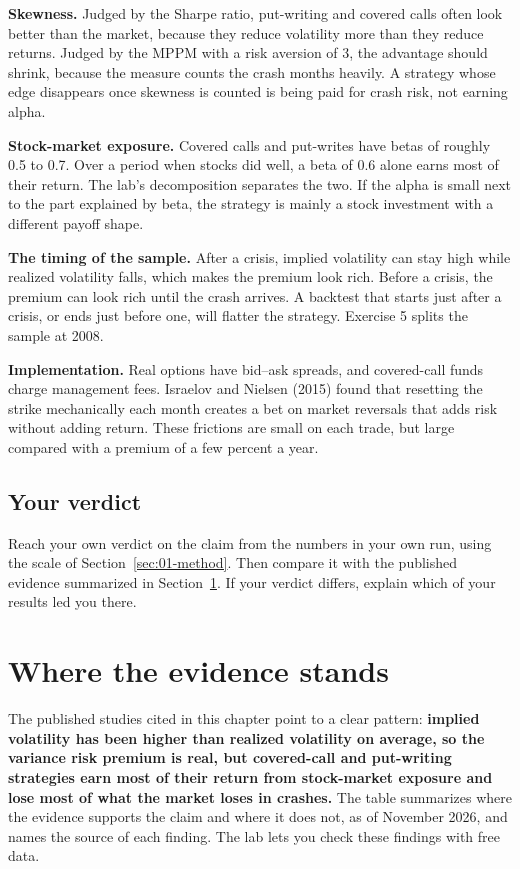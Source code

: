 \textbf{Skewness.} Judged by the Sharpe ratio, put-writing and covered calls often look better than the market, because they reduce volatility more than they reduce returns. Judged by the MPPM with a risk aversion of 3, the advantage should shrink, because the measure counts the crash months heavily. A strategy whose edge disappears once skewness is counted is being paid for crash risk, not earning alpha.

\textbf{Stock-market exposure.} Covered calls and put-writes have betas of roughly 0.5 to 0.7. Over a period when stocks did well, a beta of 0.6 alone earns most of their return. The lab's decomposition separates the two. If the alpha is small next to the part explained by beta, the strategy is mainly a stock investment with a different payoff shape.

\textbf{The timing of the sample.} After a crisis, implied volatility can stay high while realized volatility falls, which makes the premium look rich. Before a crisis, the premium can look rich until the crash arrives. A backtest that starts just after a crisis, or ends just before one, will flatter the strategy. Exercise 5 splits the sample at 2008.

\textbf{Implementation.} Real options have bid--ask spreads, and covered-call funds charge management fees. Israelov and Nielsen (2015) found that resetting the strike mechanically each month creates a bet on market reversals that adds risk without adding return. These frictions are small on each trade, but large compared with a premium of a few percent a year.

\subsection*{Your verdict}

Reach your own verdict on the claim from the numbers in your own run, using the scale of Section~\ref{sec:01-method}. Then compare it with the published evidence summarized in Section~\ref{sec:16-verdict}. If your verdict differs, explain which of your results led you there.

\section{Where the evidence stands}
\label{sec:16-verdict}

The published studies cited in this chapter point to a clear pattern: \textbf{implied volatility has been higher than realized volatility on average, so the variance risk premium is real, but covered-call and put-writing strategies earn most of their return from stock-market exposure and lose most of what the market loses in crashes.} The table summarizes where the evidence supports the claim and where it does not, as of November 2026, and names the source of each finding. The lab lets you check these findings with free data.

